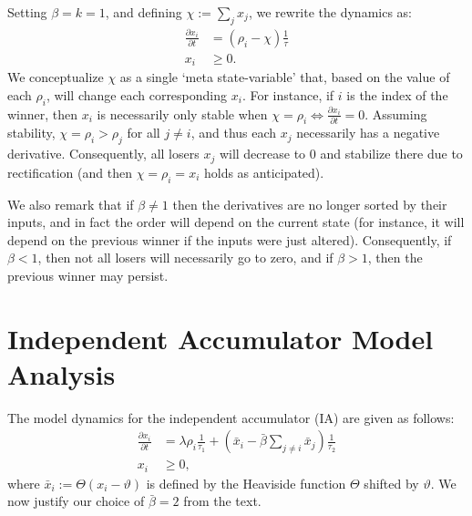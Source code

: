 \documentclass[a4paper]{article}
\begin{document}
Setting $\beta = k = 1$, and defining $\chi := \sum_j x_j$, we rewrite the dynamics as:
\begin{equation} \label{eq:um-special}
    \begin{split}
        \frac{{\partial x}_i}{\partial t} &= \left(\rho_i - \chi \right) \frac{1}{\tau} \\
        x_i &\ge 0.
    \end{split}
\end{equation}
We conceptualize $\chi$ as a single `meta state-variable' that, based on the value of each $\rho_i$, will change each corresponding $x_i$.
For instance, if $i$ is the index of the winner, then $x_i$ is necessarily only stable when $\chi = \rho_i \iff \frac{{\partial x}_i}{\partial t} = 0$.
Assuming stability, $\chi = \rho_i > \rho_j$ for all $j \ne i$, and thus each $x_j$ necessarily has a negative derivative.
Consequently, all losers $x_j$ will decrease to 0 and stabilize there due to rectification (and then $\chi = \rho_i = x_i$ holds as anticipated).

We also remark that if $\beta \ne 1$ then the derivatives are no longer sorted by their inputs, and in fact the order will depend on the current state (for instance, it will depend on the previous winner if the inputs were just altered). Consequently, if $\beta < 1$, then not all losers will necessarily go to zero, and if $\beta > 1$, then the previous winner may persist.

\section{Independent Accumulator Model Analysis}

The model dynamics for the independent accumulator (IA) are given as follows:
\begin{equation}
    \begin{split}
        \frac{{\partial x}_i}{\partial t} &= \lambda \rho_i \frac{1}{\tau_1} + \left( 
            \bar{x}_i - \bar{\beta} \sum_{j \neq i} \bar{x}_j \right) \frac{1}{\tau_2} \\
        x_i &\ge 0 ,
    \end{split}
\end{equation}
where $\bar{x}_i := \Theta(x_i - \vartheta)$ is defined by the Heaviside function $\Theta$ shifted by $\vartheta$.
We now justify our choice of $\bar{\beta} = 2$ from the text. %
\end{document}

